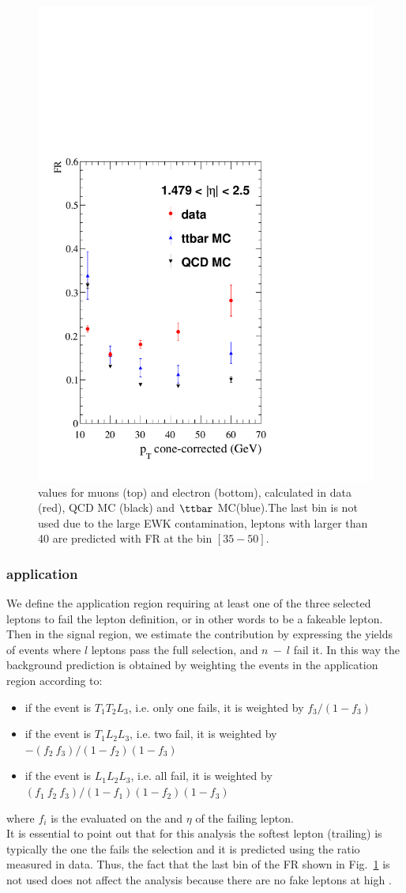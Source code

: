 \begin{figure}[h!]
\includegraphics[width=.23\textwidth]{Figures/c5/FAKE/ele3.pdf}
\caption{\fr values for muons (top) and electron (bottom), calculated in data (red), QCD MC (black) and $\ttbar$ MC(blue).The last bin is not used due to the large EWK contamination, leptons with \pt larger than 40 \GeV are predicted with FR at the bin $[35-50]$\GeV.}
\label{fig:comparison_muon}
\end{figure}

\vspace {5cm}
\subsubsection{\fr application}
We define the application region requiring at least one of the three
selected leptons to fail the \ti  lepton definition, or in other words to be a fakeable lepton. Then in the signal region, we estimate the contribution by expressing the yields of events where $l$ leptons pass the full selection, and $n \ - \ l$ fail it. In this way the background prediction is obtained by weighting the events in the application region according to:
\begin{itemize}
\setlength\itemsep{-0.2em}
\item if the event is $T_{1}T_{2}L_{3}$, i.e. only one fails, it is weighted by $f_{3}/(1-f_{3})$
\item if the event is $T_{1}L_{2}L_{3}$, i.e. two fail, it is weighted
  by $- (f_{2} \ f_{3})/(1-f_{2})(1-f_{3})$
\item if the event is $L_{1}L_{2}L_{3}$, i.e. all fail, it is weighted by $(f_{1} \ f_{2} \ f_{3})/(1-f_{1})(1-f_{2})(1-f_{3})$
\end{itemize}
where $f_{i}$ is the \fr evaluated on the \ptcone and $\eta$
of the failing lepton.\\
It is essential to point out that for this analysis the softest lepton (trailing) is typically the one the fails the \ti  selection and it is predicted using the \fr ratio measured in data. Thus, the fact that the last bin of the FR shown in Fig.~\ref{fig:comparison_muon} is not used does not affect the analysis because there are no fake leptons at high \pt. 


